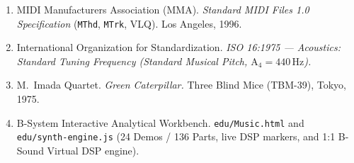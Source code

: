 \begin{enumerate}[leftmargin=1.5em]
  \item MIDI Manufacturers Association (MMA). \emph{Standard MIDI Files 1.0 Specification} (\texttt{MThd}, \texttt{MTrk}, VLQ). Los Angeles, 1996.
  \item International Organization for Standardization. \emph{ISO 16:1975 — Acoustics: Standard Tuning Frequency (Standard Musical Pitch, $\mathrm{A}_4 = 440\,\text{Hz}$).}
  \item M.~Imada Quartet. \emph{Green Caterpillar.} Three Blind Mice (TBM-39), Tokyo, 1975.
  \item B-System Interactive Analytical Workbench. \texttt{edu/Music.html} and \texttt{edu/synth-engine.js} (24 Demos / 136 Parts, live DSP markers, and 1:1 B-Sound Virtual DSP engine).
\end{enumerate}
